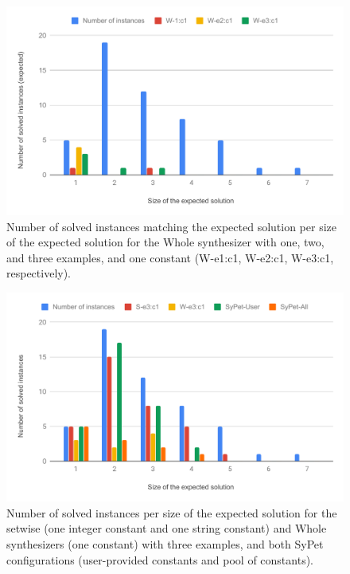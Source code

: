 \begin{figure}
  \centering
  \includegraphics[width=1.0\textwidth]{assets/bar-chart-expected-whole.pdf}
  \caption{Number of solved instances matching the expected solution per size of
    the expected solution for the Whole synthesizer with one, two, and three
    examples, and one constant (W-e1:c1, W-e2:c1, W-e3:c1, respectively).}
  \label{fig:bar-chart-expected-whole}
\end{figure}

\begin{figure}
  \centering
  \includegraphics[width=1.0\textwidth]{assets/comparison-solved-sypet.pdf}
  \caption{Number of solved instances per size of the expected solution for the
    setwise (one integer constant and one string constant) and Whole
    synthesizers (one constant) with three examples, and both SyPet
    configurations (user-provided constants and pool of constants).}
  \label{fig:comparison-solved-sypet}
\end{figure}

